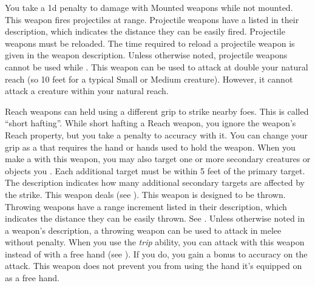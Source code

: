         You take a \minus1d penalty to damage with Mounted weapons while not mounted.
         This weapon fires projectiles at range. Projectile weapons have a  listed in their description, which indicates the distance they can be easily fired. Projectile weapons must be reloaded. The time required to reload a projectile weapon is given in the weapon description.
        Unless otherwise noted, projectile weapons cannot be used while \prone.
        \label{Reach Weapon} This weapon can be used to attack at double your natural reach (so 10 feet for a typical Small or Medium creature).
        However, it cannot attack a creature within your natural reach.

        Reach weapons can held using a different grip to strike nearby foes.
        This is called ``short hafting''.
        While short hafting a Reach weapon, you ignore the weapon's Reach property, but you take a  penalty to accuracy with it.
        You can change your grip as a  that requires the hand or hands used to hold the weapon.
         When you make a  with this weapon, you may also target one or more secondary creatures or objects you .
        Each additional target must be within 5 feet of the primary target.
        The description indicates how many additional secondary targets are affected by the strike.
         This weapon deals  (see ).
         This weapon is designed to be thrown. Throwing weapons have a range increment listed in their description, which indicates the distance they can be easily thrown. See .
        Unless otherwise noted in a weapon's description, a throwing weapon can be used to attack in melee without penalty.
         When you use the \textit{trip} ability, you can attack with this weapon instead of with a free hand (see ).
        If you do, you gain a  bonus to accuracy on the attack.
         This weapon does not prevent you from using the hand it's equipped on as a free hand.

